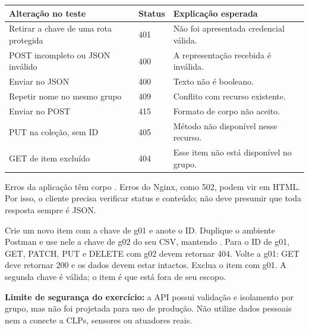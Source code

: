 \begin{tabularx}{\linewidth}{@{}p{4.7cm}lY@{}}\toprule
Alteração no teste & Status & Explicação esperada \\\midrule
Retirar a chave de uma rota protegida & 401 & Não foi apresentada credencial válida.\\
POST incompleto ou JSON inválido & 400 & A representação recebida é inválida.\\
Enviar  no JSON & 400 & Texto não é booleano.\\
Repetir nome no mesmo grupo & 409 & Conflito com recurso existente.\\
Enviar  no POST & 415 & Formato de corpo não aceito.\\
PUT na coleção, sem ID & 405 & Método não disponível nesse recurso.\\
GET de item excluído & 404 & Esse item não está disponível no grupo.\\\bottomrule
\end{tabularx}
Erros da aplicação têm corpo . Erros do Nginx, como 502, podem vir em HTML. Por isso, o cliente precisa verificar status e conteúdo; não deve presumir que toda resposta sempre é JSON.

Crie um novo item com a chave de g01 e anote o ID. Duplique o ambiente Postman e use nele a chave de g02 do seu CSV, mantendo . Para o ID de g01, GET, PATCH, PUT e DELETE com g02 devem retornar 404. Volte a g01: GET deve retornar 200 e os dados devem estar intactos. Exclua o item com g01. A segunda chave é válida; o item é que está fora de seu escopo.


\textbf{Limite de segurança do exercício:} a API possui validação e isolamento por grupo, mas não foi projetada para uso de produção. Não utilize dados pessoais nem a conecte a CLPs, sensores ou atuadores reais.

